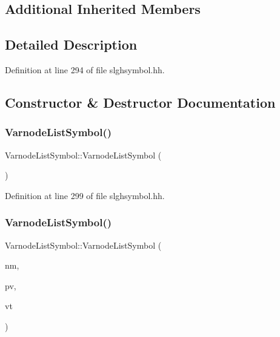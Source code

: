 \subsection*{Additional Inherited Members}


\subsection{Detailed Description}


Definition at line 294 of file slghsymbol.\+hh.



\subsection{Constructor \& Destructor Documentation}
\mbox{\label{class_varnode_list_symbol_a3926cfa7e2c864a644dc61dd9fedc5e7}} 
\subsubsection{\texorpdfstring{VarnodeListSymbol()}{VarnodeListSymbol()}\hspace{0.1cm}{\footnotesize\ttfamily [1/2]}}
{\footnotesize\ttfamily Varnode\+List\+Symbol\+::\+Varnode\+List\+Symbol (\begin{DoxyParamCaption}\item[{void}]{ }\end{DoxyParamCaption})\hspace{0.3cm}{\ttfamily [inline]}}



Definition at line 299 of file slghsymbol.\+hh.

\mbox{\label{class_varnode_list_symbol_a6e3922af9a7d8647fec38e3d305b1b92}} 
\subsubsection{\texorpdfstring{VarnodeListSymbol()}{VarnodeListSymbol()}\hspace{0.1cm}{\footnotesize\ttfamily [2/2]}}
{\footnotesize\ttfamily Varnode\+List\+Symbol\+::\+Varnode\+List\+Symbol (\begin{DoxyParamCaption}\item[{const string \&}]{nm,  }\item[{\mbox{\hyperlink{class_pattern_value}{Pattern\+Value}} $\ast$}]{pv,  }\item[{const vector$<$ \mbox{\hyperlink{class_sleigh_symbol}{Sleigh\+Symbol}} $\ast$ $>$ \&}]{vt }\end{DoxyParamCaption})}



